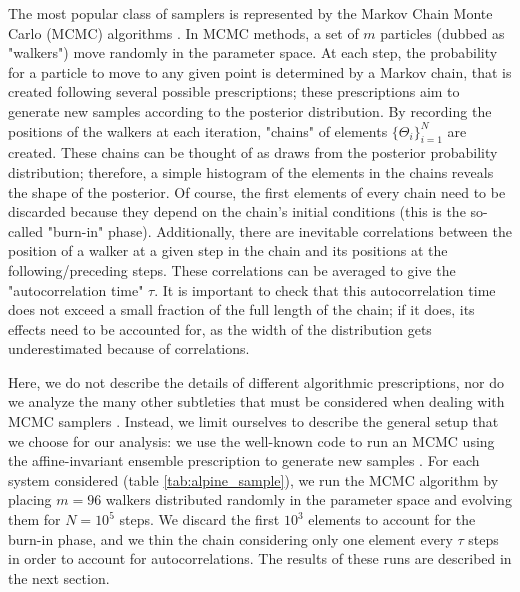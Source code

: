 The most popular class of samplers is represented by the Markov Chain Monte Carlo (MCMC) algorithms \citep{metropolis, hastings}. In MCMC methods, a set of $m$ particles (dubbed as "walkers") move randomly in the parameter space. At each step, the probability for a particle to move to any given point is determined by a Markov chain, that is created following several possible prescriptions; these prescriptions aim to generate new samples according to the posterior distribution.
%
By recording the positions of the walkers at each iteration, "chains" of elements $\{\Theta_i\}_{i=1}^N$ are created. These chains can be thought of as draws from the posterior probability distribution; therefore, a simple histogram of the elements in the chains reveals the shape of the posterior. Of course, the first elements of every chain need to be discarded because they depend on the chain's initial conditions (this is the so-called "burn-in" phase). Additionally, there are inevitable correlations between the position of a walker at a given step in the chain and its positions at the following/preceding steps. These correlations can be averaged to give the "autocorrelation time" $\tau$. It is important to check that this autocorrelation time does not exceed a small fraction of the full length of the chain; if it does, its effects need to be accounted for, as the width of the distribution gets underestimated because of correlations.


Here, we do not describe the details of different algorithmic prescriptions, nor do we analyze the many other subtleties that must be considered when dealing with MCMC samplers \citep[for a review on this, see e.g.,][]{sharma2017markov}. Instead, we limit ourselves to describe the general setup that we choose for our analysis: we use the well-known code  \citep{foreman2013emcee} to run an MCMC using the affine-invariant ensemble prescription to generate new samples \citep{goodman_prescription}. For each system considered (table \ref{tab:alpine_sample}), we run the MCMC algorithm by placing $m=96$ walkers distributed randomly in the parameter space and evolving them for $N=10^5$ steps. We discard the first $10^3$ elements to account for the burn-in phase, and we thin the chain considering only one element every $\tau$ steps in order to account for autocorrelations. The results of these runs are described in the next section.

